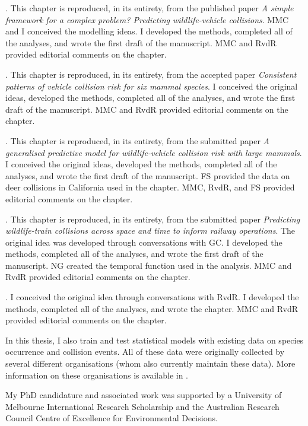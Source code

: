 \documentclass[titlesmallcaps,copyrightpage,examinerscopy]{uomthesis}
\begin{document}
. This chapter is reproduced, in its entirety, from the published paper \textit{A simple framework for a complex problem?  Predicting wildlife-vehicle collisions}. MMC and I conceived the modelling ideas. I developed the methods, completed all of the analyses, and wrote the first draft of the manuscript. MMC and RvdR provided editorial comments on the chapter.

. This chapter is reproduced, in its entirety, from the accepted paper \textit{Consistent patterns of vehicle collision risk for six mammal species}. I conceived the original ideas, developed the methods, completed all of the analyses, and wrote the first draft of the manuscript. MMC and RvdR provided editorial comments on the chapter.

. This chapter is reproduced, in its entirety, from the submitted paper \textit{A generalised predictive model for wildlife-vehicle collision risk with large mammals}. I conceived the original ideas, developed the methods, completed all of the analyses, and wrote the first draft of the manuscript. FS provided the data on deer collisions in California used in the chapter. MMC, RvdR, and FS provided editorial comments on the chapter.

. This chapter is reproduced, in its entirety, from the submitted paper \textit{Predicting wildlife-train collisions across space and time to inform railway operations}. The original idea was developed through conversations with GC. I developed the methods, completed all of the analyses, and wrote the first draft of the manuscript. NG created the temporal function used in the analysis. MMC and RvdR provided editorial comments on the chapter.

. I conceived the original idea through conversations with RvdR. I developed the methods, completed all of the analyses, and wrote the chapter. MMC and RvdR provided editorial comments on the chapter.

In this thesis, I also train and test statistical models with existing data on species occurrence and collision events. All of these data were originally collected by several different organisations (whom also currently maintain these data). More information on these organisations is available in .

My PhD candidature and associated work was supported by a University of Melbourne International Research Scholarship and the Australian Research Council Centre of Excellence for Environmental Decisions.
\end{document}
